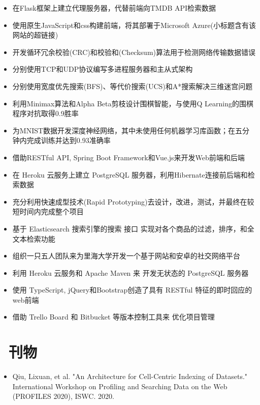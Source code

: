 \documentclass{resume}
\begin{document}
\begin{itemize}
  \item 在Flask框架上建立代理服务器，代替前端向TMDB API检索数据
  \item 使用原生JavaScript和css构建前端，将其部署于Microsoft Azure(小标题含有该网站的超链接)
\end{itemize}
\vspace{-8pt}
\begin{itemize}
  \item 开发循环冗余校验(CRC)和校验和(Checksum)算法用于检测网络传输数据错误
  \item 分别使用TCP和UDP协议编写多进程服务器和主从式架构
\end{itemize}
\vspace{-8pt}
\begin{itemize}
  \item 分别使用宽度优先搜索(BFS)、等代价搜索(UCS)和A*搜索解决三维迷宫问题
  \item 利用Minimax算法和Alpha Beta剪枝设计围棋智能，与使用Q Learning的围棋程序对抗取得0.9胜率
  \item 为MNIST数据开发深度神经网络，其中未使用任何机器学习库函数；在五分钟内完成训练并达到0.93准确率
\end{itemize}
\vspace{-10pt}
\begin{itemize}
  \item 借助RESTful API, Spring Boot Framework和Vue.js来开发Web前端和后端
  \item 在 Heroku 云服务上建立 PostgreSQL 服务器，利用Hibernate连接前后端和检索数据
  \item 充分利用快速成型技术(Rapid Prototyping)去设计，改进，测试，并最终在较短时间内完成整个项目
  \item 基于 Elasticsearch 搜索引擎的搜索 接口 实现对各个商品的过滤，排序，和全文本检索功能
\end{itemize}
\vspace{-8pt}
\begin{itemize}
  \item 组织一只五人团队来为里海大学开发一个基于网站和安卓的社交网络平台
  \item 利用 Heroku 云服务和 Apache Maven 来 开发无状态的 PostgreSQL 服务器
  \item 使用 TypeScript, jQuery和Bootstrap创造了具有 RESTful 特征的即时回应的web前端
  \item 借助 Trello Board 和 Bitbucket 等版本控制工具来 优化项目管理
\end{itemize}

\section{\faBook \ 刊物}
\begin{itemize}[parsep=0.2ex]
  \item Qiu, Lixuan, et al. "An Architecture for Cell-Centric Indexing of Datasets." International Workshop on Profiling and Searching Data on the Web (PROFILES 2020), ISWC. 2020.
\end{itemize}
\end{document}
